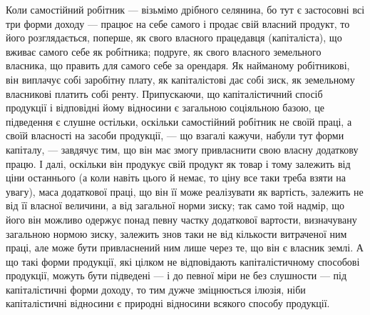 Коли самостійний робітник — візьмімо дрібного селянина, бо тут є застосовні
всі три форми доходу — працює на себе самого і продає свій власний продукт, то
його розглядається, поперше, як свого власного працедавця (капіталіста), що вживає
самого себе як робітника; подруге, як свого власного земельного власника, що править
для самого себе за орендаря. Як найманому робітникові, він виплачує собі заробітну
плату, як капіталістові дає собі зиск, як земельному власникові платить
собі ренту. Припускаючи, що капіталістичний спосіб продукції і відповідні
йому відносини є загальною соціяльною базою, це підведення є слушне
остільки, оскільки самостійний робітник не своїй праці, а своїй власності на
засоби продукції, — що взагалі кажучи, набули тут форми капіталу, — завдячує
тим, що він має змогу привласнити свою власну додаткову працю. І далі,
оскільки він продукує свій продукт як товар і тому залежить від ціни останнього
(а коли навіть цього й немає, то ціну все таки треба взяти на увагу),
маса додаткової праці, що він її може реалізувати як вартість, залежить не від
її власної величини, а від загальної норми зиску; так само той надмір, що його він
можливо одержує понад певну частку додаткової вартости, визначувану загальною
нормою зиску, залежить знов таки не від кількости витраченої ним праці, але
може бути привласнений ним лише через те, що він є власник землі. А що
такі форми продукції, які цілком не відповідають капіталістичному способові
продукції, можуть бути підведені — і до певної міри не без слушности — під капіталістичні форми
доходу, то тим дужче зміцнюється ілюзія, ніби капіталістичні
відносини є природні відносини всякого способу продукції.
\parbreak{}  %
